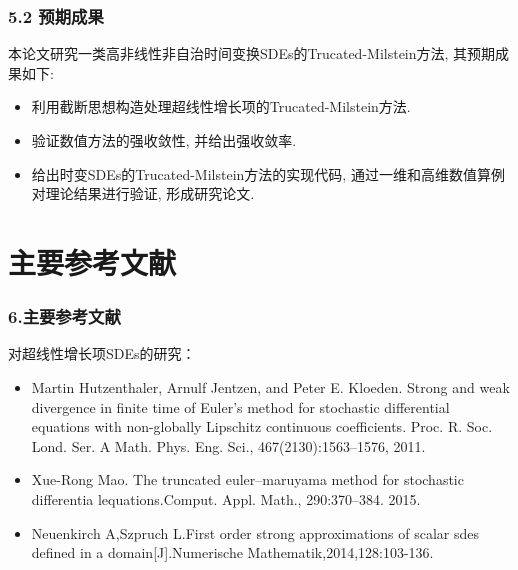 \documentclass[notheorems,10pt,compress]{beamer}
\numberwithin{figure}{section}
\numberwithin{table}{section}
\numberwithin{equation}{section}
\numberwithin{theorem}{section}
\numberwithin{definition}{section}
\numberwithin{lemma}{section}
\numberwithin{proposition}{section}
\numberwithin{corollary}{section}
\theoremstyle{example}
\begin{document}
\begin{frame}
    \frametitle{ 5.2 预期成果}
    \begin{block}{}
        \hspace{2em}本论文研究一类高非线性非自治时间变换SDEs的Trucated-Milstein方法, 其\alert{预期成果}如下:
        \vskip 6pt
        \begin{itemize}
            \setlength{\itemsep}{6pt}
            \item 利用截断思想构造处理超线性增长项的Trucated-Milstein方法.
            \item 验证数值方法的强收敛性, 并给出强收敛率.
            \item 给出时变SDEs的Trucated-Milstein方法的实现代码, 通过一维和高维数值算例对理论结果进行验证, 形成研究论文.
        \end{itemize}
    \end{block}
\end{frame}

\section{主要参考文献}


\begin{frame}
    \frametitle{6.主要参考文献\\}
    
    
    \textcolor[rgb]{0.00,0.00,1.00}{对超线性增长项SDEs的研究：}
    \begin{itemize}
        
        \item Martin Hutzenthaler, Arnulf Jentzen, and Peter E. Kloeden. Strong and weak divergence in finite time of Euler’s method for stochastic differential equations with non-globally Lipschitz continuous coefficients. Proc. R. Soc. Lond. Ser. A Math. Phys. Eng. Sci., 467(2130):1563–1576, 2011.
        \item Xue-Rong Mao. The truncated euler–maruyama method for stochastic differentia lequations.Comput. Appl. Math.,  290:370–384. 2015.
        \item Neuenkirch A,Szpruch L.First order strong approximations of scalar sdes defined in a domain[J].Numerische Mathematik,2014,128:103-136.
        
        
    \end{itemize}
\end{frame}
\end{document}
